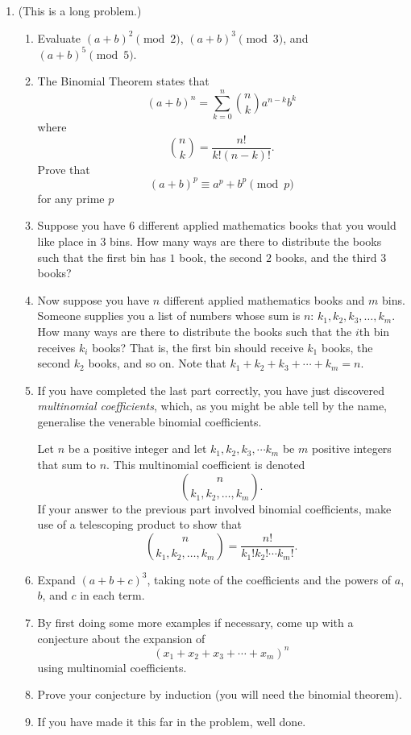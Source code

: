 \documentclass[a4paper]{article}
\begin{document}
\begin{enumerate}
\item (This is a long problem.)
  \begin{enumerate}
  \item Evaluate \((a+b)^2\pmod{2}\), \((a+b)^3\pmod{3}\),
    and \((a+b)^5\pmod{5}\).
  \item The Binomial Theorem states that
    \[(a+b)^n=\sum_{k=0}^{n}\binom{n}{k}a^{n-k}b^k\]
    where
    \[\binom{n}{k}=\frac{n!}{k!(n-k)!}.\]
    Prove that
    \[(a+b)^p\equiv a^p+b^p\pmod{p}\] for any prime \(p\)

\item Suppose you have \(6\) different applied mathematics books that you would like place in \(3\) bins. How many
  ways are there to distribute the books such that the first bin has \(1\) book, the second \(2\) books, and the third \(3\) books?
\item Now suppose you have \(n\) different applied mathematics books and \(m\) bins. Someone supplies you a list of numbers whose sum is \(n\):
  \(k_1,k_2,k_3,\ldots,k_m\). How many ways are there to distribute the books such
  that the \(i\)th bin receives \(k_i\) books? That is, the first bin should receive \(k_1\) books, the second \(k_2\) books, and so on. Note
  that \(k_1+k_2+k_3+\cdots+k_m=n\).
\item If you have completed the last part correctly, you have just discovered \emph{multinomial coefficients}, which, as you might be able
  tell by the name, generalise the venerable binomial coefficients.

  Let \(n\) be a positive integer and let \(k_1,k_2,k_3,\cdots k_m\) be \(m\) positive integers that sum to \(n\). This multinomial coefficient
  is denoted \[\binom{n}{k_1,k_2,\ldots,k_m}.\] If your answer to the previous part involved binomial coefficients, make use of a
  telescoping product to show that \[\binom{n}{k_1,k_2,\ldots,k_m}=\frac{n!}{k_1!k_2!\cdots k_m!}.\]
\item Expand \((a+b+c)^3\), taking note of the coefficients and the powers of \(a\), \(b\), and \(c\) in each term.
\item By first doing some more examples if necessary, come up with a conjecture about the expansion of
  \[(x_1+x_2+x_3+\cdots+x_m)^n\]
  using multinomial coefficients.
\item Prove your conjecture by induction (you will need the binomial theorem).
\item If you have made it this far in the problem, well done.


\end{enumerate}
\end{enumerate}
\end{document}
